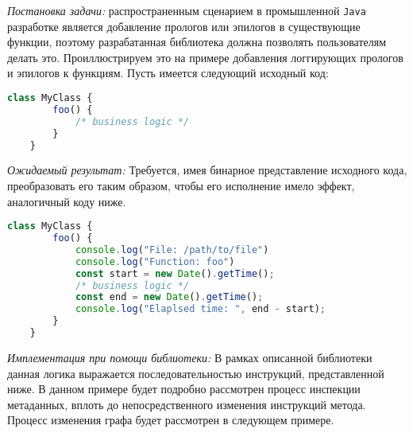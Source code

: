 \textit{Постановка задачи:} распространенным сценарием в промышленной \texttt{Java} разработке является добавление прологов или эпилогов в существующие функции, поэтому разрабатанная библиотека должна позволять пользователям делать это. Проиллюстрируем это на примере добавления логгирующих прологов и эпилогов к функциям. Пусть имеется следующий исходный код:

\begin{lstlisting}[language=javascript, label=lst:]
    class MyClass {
        foo() {
            /* business logic */
        }
    }
\end{lstlisting}

\textit{Ожидаемый результат:} Требуется, имея бинарное представление исходного кода, преобразовать его таким образом, чтобы его исполнение имело эффект, аналогичный коду ниже.

\begin{lstlisting}[language=javascript, label=lst:]
    class MyClass {
        foo() {
            console.log("File: /path/to/file")
            console.log("Function: foo")
            const start = new Date().getTime();
            /* business logic */
            const end = new Date().getTime();
            console.log("Elaplsed time: ", end - start);
        }
    }
\end{lstlisting}

\textit{Имплементация при помощи библиотеки:} В рамках описанной библиотеки данная логика выражается последовательностью инструкций, представленной ниже. В данном примере будет подробно рассмотрен процесс инспекции метаданных, вплоть до непосредственного изменения инструкций метода. Процесс изменения графа будет рассмотрен в следующем примере.


